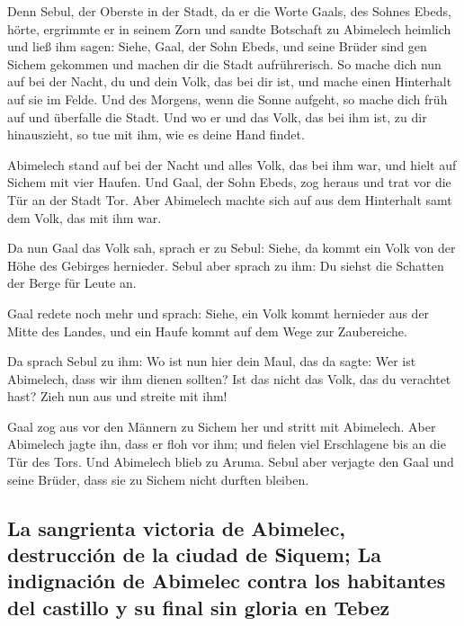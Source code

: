  Denn Sebul, der Oberste in der Stadt, da er die Worte
Gaals, des Sohnes Ebeds, hörte, ergrimmte er in seinem Zorn
 und sandte Botschaft zu Abimelech heimlich und ließ ihm
sagen: Siehe, Gaal, der Sohn Ebeds, und seine Brüder sind gen Sichem
gekommen und machen dir die Stadt aufrührerisch.  So
mache dich nun auf bei der Nacht, du und dein Volk, das bei dir ist, und
mache einen Hinterhalt auf sie im Felde.  Und des
Morgens, wenn die Sonne aufgeht, so mache dich früh auf und überfalle
die Stadt. Und wo er und das Volk, das bei ihm ist, zu dir hinauszieht,
so tue mit ihm, wie es deine Hand findet.

 Abimelech stand auf bei der Nacht und alles Volk, das
bei ihm war, und hielt auf Sichem mit vier Haufen.  Und
Gaal, der Sohn Ebeds, zog heraus und trat vor die Tür an der Stadt Tor.
Aber Abimelech machte sich auf aus dem Hinterhalt samt dem Volk, das mit
ihm war.

 Da nun Gaal das Volk sah, sprach er zu Sebul: Siehe, da
kommt ein Volk von der Höhe des Gebirges hernieder. Sebul aber sprach zu
ihm: Du siehst die Schatten der Berge für Leute an.

 Gaal redete noch mehr und sprach: Siehe, ein Volk kommt
hernieder aus der Mitte des Landes, und ein Haufe kommt auf dem Wege zur
Zaubereiche.

 Da sprach Sebul zu ihm: Wo ist nun hier dein Maul, das
da sagte: Wer ist Abimelech, dass wir ihm dienen sollten? Ist das nicht
das Volk, das du verachtet hast? Zieh nun aus und streite mit ihm!

 Gaal zog aus vor den Männern zu Sichem her und stritt
mit Abimelech.  Aber Abimelech jagte ihn, dass er floh
vor ihm; und fielen viel Erschlagene bis an die Tür des Tors.
 Und Abimelech blieb zu Aruma. Sebul aber verjagte den
Gaal und seine Brüder, dass sie zu Sichem nicht durften bleiben.

\hypertarget{la-sangrienta-victoria-de-abimelec-destrucciuxf3n-de-la-ciudad-de-siquem-la-indignaciuxf3n-de-abimelec-contra-los-habitantes-del-castillo-y-su-final-sin-gloria-en-tebez}{%
\subsection{La sangrienta victoria de Abimelec, destrucción de la ciudad
de Siquem; La indignación de Abimelec contra los habitantes del castillo
y su final sin gloria en
Tebez}\label{la-sangrienta-victoria-de-abimelec-destrucciuxf3n-de-la-ciudad-de-siquem-la-indignaciuxf3n-de-abimelec-contra-los-habitantes-del-castillo-y-su-final-sin-gloria-en-tebez}}

